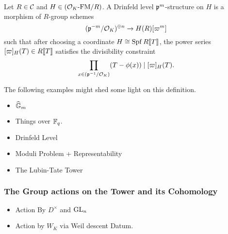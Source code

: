 \label{subsub:Deformations of Formal Modules with Drinfeld Level Structure}
\begin{defi}
  Let $R \in \mathcal{C}$ and $H \in {({\mathcal{O}_K}\text-\mathrm{FM}/{R})}$. A Drinfeld level 
  $\mathfrak{p}^m$-structure on $H$ is a morphism of $R$-group schemes 
  \begin{equation*}
    (\mathfrak{p}^{-m}/\mathcal{O}_K)^{\oplus n} \to H(R)[\varpi^m]
  \end{equation*}
  such that after choosing a coordinate $H \cong \operatorname{Spf} R\llbracket T \rrbracket$, the 
  power series $[\varpi]_H(T) \in R\llbracket T \rrbracket$ satisfies the divisibility constraint
  \begin{equation*}
    \prod_{x \in (\mathfrak{p}^{-1}/\mathcal{O}_K)}(T - \phi(x)) \mid  [\varpi]_H(T).
  \end{equation*}
\end{defi}
The following examples might shed some light on this definition.
\begin{xpl}
  \begin{itemize}
    \item $\widehat{\mathbb{G}}_m$
    \item Things over $\mathbb{F}_q$.
  \end{itemize}
\end{xpl}

\begin{itemize}
  \item Drinfeld Level
  \item Moduli Problem + Representability
  \item The Lubin-Tate Tower
\end{itemize}

\subsubsection{The Group actions on the Tower and its Cohomology} %
\label{subsub:The Group actions on the Tower}
\begin{itemize}
  \item Action By $D^\times$ and $\operatorname{GL}_n$
  \item Action by $W_K$ via Weil descent Datum.
\end{itemize}
